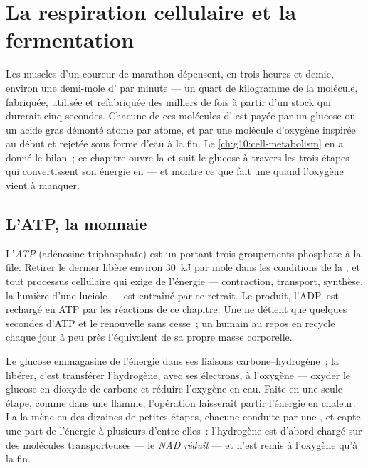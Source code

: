 \chapter{La respiration cellulaire et la fermentation}\label{ch:g12:respiration-fermentation}

Les muscles d'un coureur de marathon dépensent, en trois heures et
demie, environ une demi-mole d' par minute --- un quart de
kilogramme de la molécule, fabriquée, utilisée et refabriquée des
milliers de fois à partir d'un stock qui durerait cinq secondes.
Chacune de ces molécules d' est payée par un glucose ou un acide
gras démonté atome par atome, et par une molécule d'oxygène inspirée
au début et rejetée sous forme d'eau à la fin. Le
\cref{ch:g10:cell-metabolism} en a donné le bilan~; ce chapitre ouvre
la  et suit le glucose à travers les trois étapes qui
convertissent son énergie en  --- et montre ce que fait une 
quand l'oxygène vient à manquer.

\section{L'ATP, la monnaie}

\begin{definition}[ATP]\label{def:g12:respiration-fermentation:atp}
L'\emph{ATP} (adénosine triphosphate) est un 
portant trois groupements phosphate à la file. Retirer le dernier
libère environ \qty{30}{kJ} par mole dans les conditions de la
, et tout processus cellulaire qui exige de
l'énergie --- contraction, transport, synthèse, la lumière d'une
luciole --- est entraîné par ce retrait. Le produit, l'ADP, est
rechargé en ATP par les réactions de ce chapitre. Une  ne
détient que quelques secondes d'ATP et le renouvelle sans cesse~; un
humain au repos en recycle chaque jour à peu près l'équivalent de sa
propre masse corporelle.
\end{definition}

\begin{proposition}\label{prop:g12:respiration-fermentation:oxidation}
Le glucose emmagasine de l'énergie dans ses liaisons
carbone--hydrogène~; la libérer, c'est transférer l'hydrogène, avec
ses électrons, à l'oxygène --- oxyder le glucose en dioxyde de carbone
et réduire l'oxygène en eau. Faite en une seule étape, comme dans une
flamme, l'opération laisserait partir l'énergie en chaleur. La 
la mène en des dizaines de petites étapes, chacune conduite par une
, et capte une part de l'énergie à plusieurs d'entre elles~:
l'hydrogène est d'abord chargé sur des molécules
transporteuses --- le \emph{NAD réduit} --- et n'est remis à l'oxygène
qu'à la fin.
\end{proposition}
\admitted

